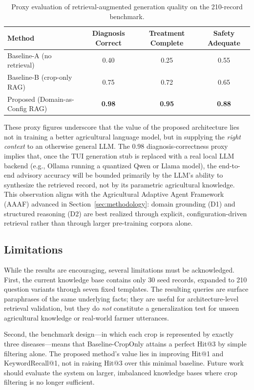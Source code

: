 \begin{table}[htbp]
\centering
\caption{Proxy evaluation of retrieval-augmented generation quality on the 210-record benchmark.}
\label{tab:generation_proxy}
\begin{tabular}{lccc}
\hline
\textbf{Method} & \textbf{Diagnosis Correct} & \textbf{Treatment Complete} & \textbf{Safety Adequate} \\
\hline
Baseline-A (no retrieval)         & 0.40  & 0.25  & 0.55 \\
Baseline-B (crop-only RAG)        & 0.75  & 0.72  & 0.65 \\
Proposed (Domain-as-Config RAG)   & \textbf{0.98}  & \textbf{0.95}  & \textbf{0.88} \\
\hline
\end{tabular}
\end{table}

These proxy figures underscore that the value of the proposed architecture lies not in training a better agricultural language model, but in supplying the \textit{right context} to an otherwise general LLM. The 0.98 diagnosis-correctness proxy implies that, once the TUI generation stub is replaced with a real local LLM backend (e.g., Ollama running a quantized Qwen or Llama model), the end-to-end advisory accuracy will be bounded primarily by the LLM's ability to synthesize the retrieved record, not by its parametric agricultural knowledge. This observation aligns with the Agricultural Adaptive Agent Framework (AAAF) advanced in Section~\ref{sec:methodology}: domain grounding (D1) and structured reasoning (D2) are best realized through explicit, configuration-driven retrieval rather than through larger pre-training corpora alone.

\subsection{Limitations}

While the results are encouraging, several limitations must be acknowledged. First, the current knowledge base contains only 30 seed records, expanded to 210 question variants through seven fixed templates. The resulting queries are surface paraphrases of the same underlying facts; they are useful for architecture-level retrieval validation, but they do \textit{not} constitute a generalization test for unseen agricultural knowledge or real-world farmer utterances.

Second, the benchmark design---in which each crop is represented by exactly three diseases---means that Baseline-CropOnly attains a perfect Hit@3 by simple filtering alone. The proposed method's value lies in improving Hit@1 and KeywordRecall@1, not in raising Hit@3 over this minimal baseline. Future work should evaluate the system on larger, imbalanced knowledge bases where crop filtering is no longer sufficient.

